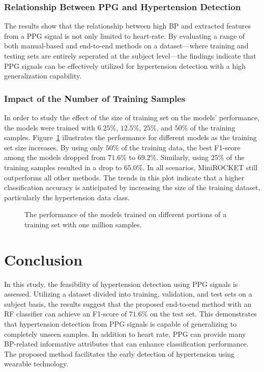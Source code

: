 \documentclass[letterpaper, 10 pt, conference]{ieeeconf}
\begin{document}
\subsubsection{Relationship Between PPG and Hypertension Detection}

The results show that the relationship between high BP and extracted features from a PPG signal is not only limited to heart-rate. By evaluating a range of both manual-based and end-to-end methods on a dataset—where training and testing sets are entirely seperated at the subject level—the findings indicate that PPG signals can be effectively utilized for hypertension detection with a high generalization capability.




\subsubsection{Impact of the Number of Training Samples}
In order to study the effect of the size of training set on the models' performance, the models were trained with $6.25\%$, $12.5\%$, $25\%$, and $50\%$ of the training samples. Figure~\ref{figure:bp} illustrates the performance for different models as the training set size increases.
By using only $50\%$ of the training data, the best F1-score among the models dropped from $71.6\%$ to $69.2\%$. Similarly, using $25\%$ of the training samples resulted in a drop to $65.0\%$. 
In all scenarios, MiniROCKET still outperforms all other methods. The trends in this plot indicate that a higher classification accuracy is anticipated by increasing the size of the training dataset, particularly the hypertension data class.



\begin{figure}[t]
	\centering
	\caption{The performance of the models trained on different portions of a training set with one million samples.}
	\vspace{-6mm}
\label{figure:bp}
\end{figure}


\section{Conclusion}

In this study, the feasibility of hypertension detection using PPG signals is assessed. Utilizing a dataset divided into training, validation, and test sets on a subject basis, the results suggest that the proposed end-to-end method with an RF classifier can achieve an F1-score of $71.6\%$ on the test set. This demonstrates that hypertension detection from PPG signals is capable of generalizing to completely unseen samples. In addition to heart rate, PPG can provide many BP-related informative attributes that can enhance classification performance. The proposed method facilitates the early detection of hypertension using wearable technology.





\addtolength{\textheight}{-12cm}   
















\end{document}
